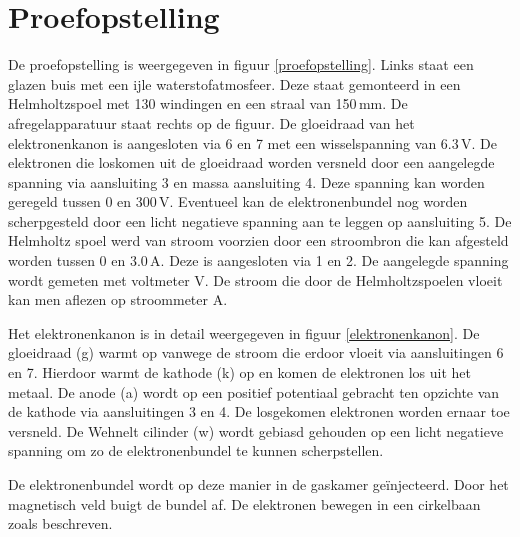 \section{Proefopstelling}


De proefopstelling is weergegeven in figuur \ref{proefopstelling}. Links staat 
een glazen buis met een ijle waterstofatmosfeer. Deze staat gemonteerd in een 
Helmholtzspoel met 130 windingen en een straal van 150\,mm. De 
afregelapparatuur staat rechts op de figuur. De gloeidraad van het 
elektronenkanon is aangesloten via 6 en 7 met een wisselspanning van 6.3\,V. De 
elektronen die loskomen uit de gloeidraad worden versneld door een aangelegde 
spanning via aansluiting 3 en massa aansluiting 4. Deze spanning kan worden 
geregeld tussen 0 en 300\,V. Eventueel kan de elektronenbundel nog worden 
scherpgesteld door een licht negatieve spanning aan te leggen op aansluiting 5.  
De Helmholtz spoel werd van stroom voorzien door een stroombron die kan 
afgesteld worden tussen 0 en 3.0\,A. Deze is aangesloten via 1 en 2. De 
aangelegde spanning wordt gemeten met voltmeter V. De stroom die door de 
Helmholtzspoelen vloeit kan men aflezen op stroommeter A.


Het elektronenkanon is in detail weergegeven in figuur \ref{elektronenkanon}.  
De gloeidraad (g) warmt op vanwege de stroom die erdoor vloeit via 
aansluitingen 6 en 7. Hierdoor warmt de kathode (k) op en komen de elektronen 
los uit het metaal. De anode (a) wordt op een positief potentiaal gebracht ten 
opzichte van de kathode via aansluitingen 3 en 4.  De losgekomen elektronen 
worden ernaar toe versneld.  De Wehnelt cilinder (w) wordt gebiasd gehouden op 
een licht negatieve spanning om zo de elektronenbundel te kunnen scherpstellen.

De elektronenbundel wordt op deze manier in de gaskamer ge\"injecteerd. Door 
het magnetisch veld buigt de bundel af. De elektronen bewegen in een cirkelbaan 
zoals beschreven. 
